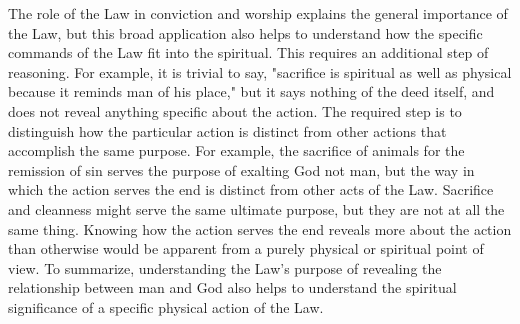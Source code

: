 \documentclass[12pt]{turabian-researchpaper}
\begin{document}
\par
The role of the Law in conviction and worship explains the general importance of the Law, but this broad application also helps to understand how the specific commands of the Law fit into the spiritual. 
This requires an additional step of reasoning. 
For example, it is trivial to say, "sacrifice is spiritual as well as physical because it reminds man of his place," but it says nothing of the deed itself, and does not reveal anything specific about the action. 
The required step is to distinguish how the particular action is distinct from other actions that accomplish the same purpose. 
For example, the sacrifice of animals for the remission of sin serves the purpose of exalting God not man, but the way in which the action serves the end is distinct from other acts of the Law.
Sacrifice and cleanness might serve the same ultimate purpose, but they are not at all the same thing. 
Knowing how the action serves the end reveals more about the action than otherwise would be apparent from a purely physical or spiritual point of view.
To summarize, understanding the Law's purpose of revealing the relationship between man and God also helps to understand the spiritual significance of a specific physical action of the Law. 
\end{document}
